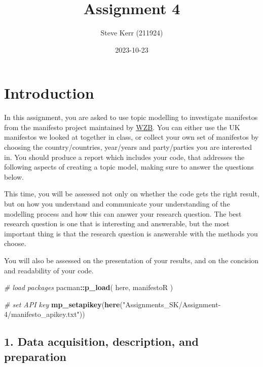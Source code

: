\documentclass[
]{article}
\title{Assignment 4}
\author{Steve Kerr (211924)}
\date{2023-10-23}
\newenvironment{Shaded}{\begin{snugshade}}{\end{snugshade}}
\newcommand{\CommentTok}[1]{\textcolor[rgb]{0.56,0.35,0.01}{\textit{#1}}}
\newcommand{\FunctionTok}[1]{\textcolor[rgb]{0.13,0.29,0.53}{\textbf{#1}}}
\newcommand{\NormalTok}[1]{#1}
\newcommand{\SpecialCharTok}[1]{\textcolor[rgb]{0.81,0.36,0.00}{\textbf{#1}}}
\newcommand{\StringTok}[1]{\textcolor[rgb]{0.31,0.60,0.02}{#1}}
\begin{document}
\maketitle

\hypertarget{introduction}{%
\section{Introduction}\label{introduction}}

In this assignment, you are asked to use topic modelling to investigate
manifestos from the manifesto project maintained by
\href{https://manifesto-project.wzb.eu/}{WZB}. You can either use the UK
manifestos we looked at together in class, or collect your own set of
manifestos by choosing the country/countries, year/years and
party/parties you are interested in. You should produce a report which
includes your code, that addresses the following aspects of creating a
topic model, making sure to answer the questions below.

This time, you will be assessed not only on whether the code gets the
right result, but on how you understand and communicate your
understanding of the modelling process and how this can answer your
research question. The best research question is one that is interesting
and answerable, but the most important thing is that the research
question is answerable with the methods you choose.

You will also be assessed on the presentation of your results, and on
the concision and readability of your code.

\begin{Shaded}
\begin{Highlighting}[]
\CommentTok{\# load packages}
\NormalTok{pacman}\SpecialCharTok{::}\FunctionTok{p\_load}\NormalTok{(}
\NormalTok{  here,}
\NormalTok{  manifestoR}
\NormalTok{  )}

\CommentTok{\# set API key}
\FunctionTok{mp\_setapikey}\NormalTok{(}\FunctionTok{here}\NormalTok{(}\StringTok{"Assignments\_SK/Assignment{-}4/manifesto\_apikey.txt"}\NormalTok{))}
\end{Highlighting}
\end{Shaded}

\hypertarget{data-acquisition-description-and-preparation}{%
\subsection{1. Data acquisition, description, and
preparation}\label{data-acquisition-description-and-preparation}}
\end{document}
